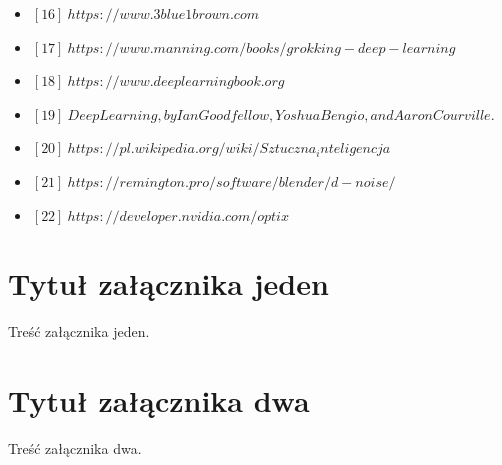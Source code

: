 \documentclass[brudnopis]{xmgr}
\begin{document}
\begin{itemize}
\item $[16]\:https://www.3blue1brown.com$
\item $[17]\:https://www.manning.com/books/grokking-deep-learning$
\item $[18]\:https://www.deeplearningbook.org$
\item $[19]\:Deep Learning, by Ian Goodfellow, Yoshua Bengio, and Aaron Courville.$
\item $[20]\:https://pl.wikipedia.org/wiki/Sztuczna_inteligencja$
\item $[21]\:https://remington.pro/software/blender/d-noise/$
\item $[22]\:https://developer.nvidia.com/optix$

\end{itemize}


\appendix
\chapter{Tytuł załącznika jeden}

Treść załącznika jeden.

\chapter{Tytuł załącznika dwa}

Treść załącznika dwa.





\oswiadczenie
\end{document}
